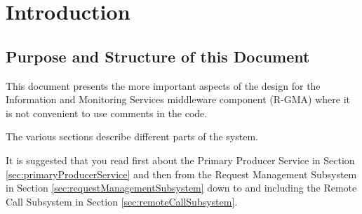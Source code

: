 \section{Introduction}
\label{sec:Introduction}

\subsection{Purpose and Structure of this Document}

This document presents the more important aspects of the design for the Information
and Monitoring Services middleware component (R-GMA) where it is not convenient
to use comments in the code. 

The various sections describe different parts of the system.

It is suggested that you read first about the Primary Producer Service
in Section \ref{sec:primaryProducerService} and then from the Request
Management Subsystem in Section \ref{sec:requestManagementSubsystem}
down to and including the Remote Call Subsystem in Section
\ref{sec:remoteCallSubsystem}.
